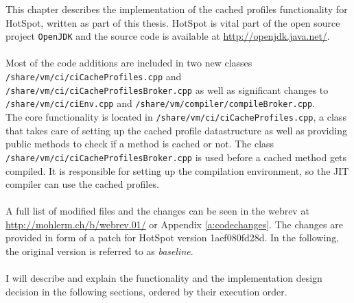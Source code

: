 This chapter describes the implementation of the cached profiles functionality for HotSpot, written as part of this thesis.
HotSpot is vital part of the open source project \texttt{OpenJDK} and the source code is available at \url{http://openjdk.java.net/}.
\\\\
Most of the code additions are included in two new classes \texttt{/share/vm/ci/ciCacheProfiles.cpp} and \\\texttt{/share/vm/ci/ciCacheProfilesBroker.cpp} as well as significant changes to \texttt{/share/vm/ci/ciEnv.cpp} and \texttt{/share/vm/compiler/compileBroker.cpp}.
\\
The core functionality is located in \texttt{/share/vm/ci/ciCacheProfiles.cpp}, a class that takes care of setting up the cached profile datastructure as well as providing public methods to check if a method is cached or not. The class \texttt{/share/vm/ci/ciCacheProfilesBroker.cpp} is used before a cached method gets compiled. It is responsible for setting up the compilation environment, so the JIT compiler can use the cached profiles.
\\\\
A full list of modified files and the changes can be seen in the webrev at \url{http://mohlerm.ch/b/webrev.01/} or Appendix \ref{a:codechanges}.
The changes are provided in form of a patch for HotSpot version 1aef080fd28d. In the following, the original version is referred to as \textit{baseline}.
\\\\
I will describe and explain the functionality and the implementation design decision in the following sections, ordered by their execution order.

